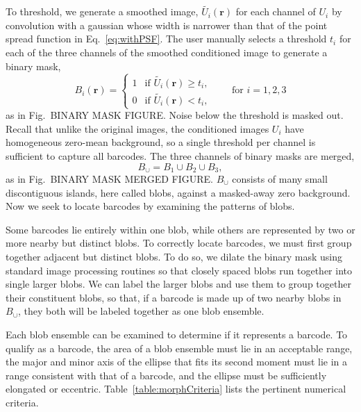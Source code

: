  To threshold, we generate a smoothed image, $\tilde{U_i}(\mathbf{r})$ for each channel of $U_i$ by  convolution with a gaussian whose width is narrower than that of the point spread function in Eq.~\ref{eq:withPSF}. The user manually selects a threshold $t_i$ for each of the three channels of the smoothed conditioned image to generate a binary mask,
\begin{equation}
	B_i(\mathbf{r}) = \left\{
	\begin{array}{rl}
		 1 & \text{if } \tilde{U_i}(\mathbf{r}) \geq t_i,\\
		 0 & \text{if } \tilde{U_i}(\mathbf{r}) < t_i,
	\end{array} \right. \qquad\text{for } i=1,2,3
\end{equation}
as in Fig.~BINARY MASK FIGURE. Noise below the threshold is masked out. Recall that unlike the original images, the conditioned images $U_i$ have homogeneous zero-mean  background, so a single threshold per channel is sufficient to capture all barcodes. The three channels of binary masks are merged, 
\begin{equation}
B_{\cup}=B_1\cup B_2 \cup B_3, 
\end{equation}
as in Fig.~BINARY MASK MERGED FIGURE. $B_\cup$ consists of many small discontiguous islands, here called blobs, against a masked-away zero background.  Now we seek to locate barcodes by examining the patterns of blobs.

Some barcodes lie entirely within one blob, while others are represented by two or more nearby but distinct blobs. To correctly locate barcodes, we must first  group together adjacent but distinct blobs.  To do so, we dilate the binary mask using standard image processing routines \citep{matlab_version_2010} so that closely spaced blobs run together into single larger blobs. We can label the larger blobs and use them to group together their constituent blobs, so that, if a barcode is made up of two nearby blobs in $B_\cup$, they both will be labeled together as one blob ensemble.

Each blob ensemble can be examined to determine if it represents a barcode. To qualify as a barcode, the area of a blob ensemble must lie in an acceptable range, the major and minor axis of the ellipse that fits its second moment must lie in a range consistent with that of a barcode, and the ellipse must be sufficiently elongated or eccentric. Table~\ref{table:morphCriteria} lists the pertinent numerical criteria. 

